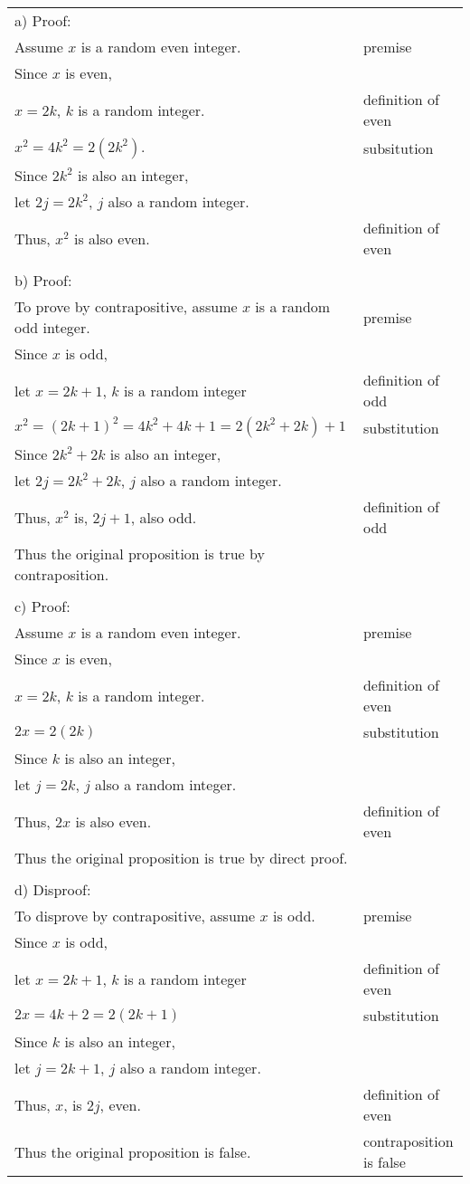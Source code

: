 \documentclass[12pt]{exam}
\begin{document}
\begin{solution}
\begin{tabular}{ll}
a) Proof: \\
Assume $x$ is a random even integer. &premise\\
Since $x$ is even,\\
$x=2k$, $k$ is a random integer. &definition of even\\
$x^2= 4k^2 = 2(2k^2)$. &subsitution\\
Since $2k^2$ is also an integer,\\
let $2j=2k^2$, $j$ also a random integer.\\
Thus, $x^2$ is also even. &definition of even\\
\\
b) Proof:\\
To prove by contrapositive, assume $x$ is a random odd integer. &premise\\
Since $x$ is odd,\\
let $x=2k+1$, $k$ is a random integer &definition of odd\\
$x^2=(2k+1)^2=4k^2+4k+1=2(2k^2+2k)+1$ & substitution\\
Since $2k^2+2k$ is also an integer,\\
let $2j=2k^2+2k$, $j$ also a random integer.\\
Thus, $x^2$ is, $2j+1$, also odd. &definition of odd\\
Thus the original proposition is true by contraposition.\\
\\
c) Proof:\\
Assume $x$ is a random even integer. &premise\\
Since $x$ is even,\\
$x=2k$, $k$ is a random integer. &definition of even\\
$2x=2(2k)$ &substitution\\
Since $k$ is also an integer,\\
let $j=2k$, $j$ also a random integer.\\
Thus, $2x$ is also even. &definition of even\\
Thus the original proposition is true by direct proof.\\
\\
d) Disproof:\\
To disprove by contrapositive, assume $x$ is odd.&premise\\
Since $x$ is odd,\\
let $x=2k+1$, $k$ is a random integer &definition of even\\
$2x=4k+2=2(2k+1)$ &substitution\\
Since $k$ is also an integer,\\
let $j=2k+1$, $j$ also a random integer.\\
Thus, $x$, is $2j$, even. &definition of even\\
Thus the original proposition is false. &contraposition is false\\
\end{tabular}
\end{solution}
\end{document}
